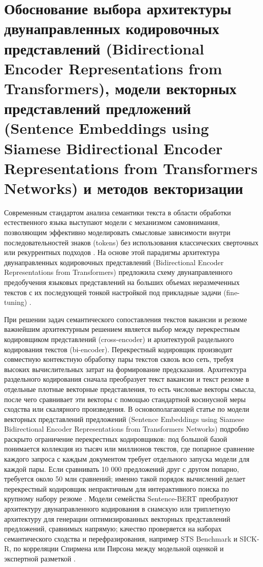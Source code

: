 \section{Обоснование выбора архитектуры двунаправленных кодировочных представлений (Bidirectional Encoder Representations from Transformers), модели векторных представлений предложений (Sentence Embeddings using Siamese Bidirectional Encoder Representations from Transformers Networks) и методов векторизации}
Современным стандартом анализа семантики текста в области обработки естественного языка выступают модели с механизмом самовнимания, позволяющим эффективно моделировать смысловые зависимости внутри последовательностей знаков (tokens) без использования классических сверточных или рекуррентных подходов \cite{src07}. На основе этой парадигмы архитектура двунаправленных кодировочных представлений (Bidirectional Encoder Representations from Transformers) предложила схему двунаправленного предобучения языковых представлений на больших объемах неразмеченных текстов с их последующей тонкой настройкой под прикладные задачи (fine-tuning) \cite{src05}.\par
При решении задач семантического сопоставления текстов вакансии и резюме важнейшим архитектурным решением является выбор между перекрестным кодировщиком представлений (cross-encoder) и архитектурой раздельного кодирования текстов (bi-encoder). Перекрестный кодировщик производит совместную контекстную обработку пары текстов сквозь всю сеть, требуя высоких вычислительных затрат на формирование предсказания. Архитектура раздельного кодирования сначала преобразует текст вакансии и текст резюме в отдельные плотные векторные представления, то есть числовые векторы смысла, после чего сравнивает эти векторы с помощью стандартной косинусной меры сходства или скалярного произведения. В основополагающей статье по модели векторных представлений предложений (Sentence Embeddings using Siamese Bidirectional Encoder Representations from Transformers Networks) подробно раскрыто ограничение перекрестных кодировщиков: под большой базой понимается коллекция из тысяч или миллионов текстов, где попарное сравнение каждого запроса с каждым документом требует отдельного запуска модели для каждой пары. Если сравнивать 10 000 предложений друг с другом попарно, требуется около 50 млн сравнений; именно такой порядок вычислений делает перекрестный кодировщик непрактичным для интерактивного поиска по крупному набору резюме \cite{src06}. Модели семейства Sentence-BERT преобразуют архитектуру двунаправленного кодирования в сиамскую или триплетную архитектуру для генерации оптимизированных векторных представлений предложений, сравнимых напрямую; качество проверяется на наборах семантического сходства и перефразирования, например STS Benchmark и SICK-R, по корреляции Спирмена или Пирсона между модельной оценкой и экспертной разметкой \cite{src06, src29}.\par
